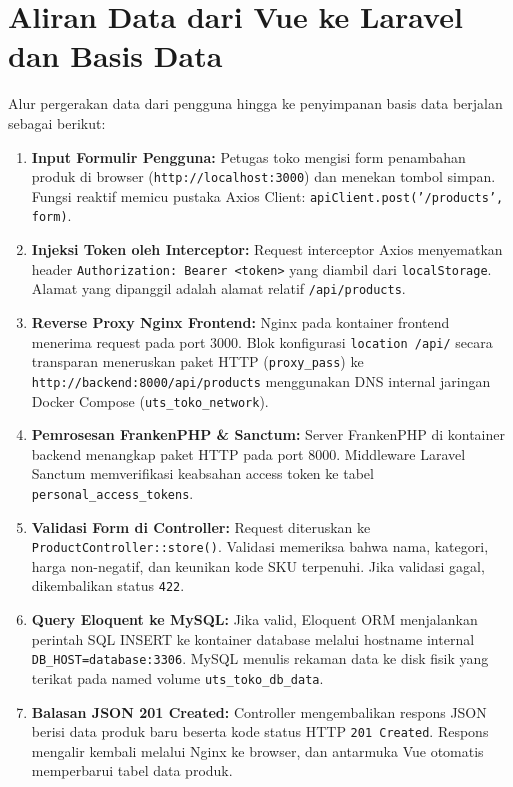 \documentclass[11pt,a4paper]{article}
\begin{document}
\section{Aliran Data dari Vue ke Laravel dan Basis Data}
Alur pergerakan data dari pengguna hingga ke penyimpanan basis data berjalan sebagai berikut:
\begin{enumerate}
    \item \textbf{Input Formulir Pengguna:} Petugas toko mengisi form penambahan produk di browser (\texttt{http://localhost:3000}) dan menekan tombol simpan. Fungsi reaktif memicu pustaka Axios Client: \texttt{apiClient.post('/products', form)}.
    \item \textbf{Injeksi Token oleh Interceptor:} Request interceptor Axios menyematkan header \texttt{Authorization: Bearer <token>} yang diambil dari \texttt{localStorage}. Alamat yang dipanggil adalah alamat relatif \texttt{/api/products}.
    \item \textbf{Reverse Proxy Nginx Frontend:} Nginx pada kontainer frontend menerima request pada port 3000. Blok konfigurasi \texttt{location /api/} secara transparan meneruskan paket HTTP (\texttt{proxy\_pass}) ke \texttt{http://backend:8000/api/products} menggunakan DNS internal jaringan Docker Compose (\texttt{uts\_toko\_network}).
    \item \textbf{Pemrosesan FrankenPHP \& Sanctum:} Server FrankenPHP di kontainer backend menangkap paket HTTP pada port 8000. Middleware Laravel Sanctum memverifikasi keabsahan access token ke tabel \texttt{personal\_access\_tokens}.
    \item \textbf{Validasi Form di Controller:} Request diteruskan ke \texttt{ProductController::store()}. Validasi memeriksa bahwa nama, kategori, harga non-negatif, dan keunikan kode SKU terpenuhi. Jika validasi gagal, dikembalikan status \texttt{422}.
    \item \textbf{Query Eloquent ke MySQL:} Jika valid, Eloquent ORM menjalankan perintah SQL INSERT ke kontainer database melalui hostname internal \texttt{DB\_HOST=database:3306}. MySQL menulis rekaman data ke disk fisik yang terikat pada named volume \texttt{uts\_toko\_db\_data}.
    \item \textbf{Balasan JSON 201 Created:} Controller mengembalikan respons JSON berisi data produk baru beserta kode status HTTP \texttt{201 Created}. Respons mengalir kembali melalui Nginx ke browser, dan antarmuka Vue otomatis memperbarui tabel data produk.
\end{enumerate}
\end{document}
